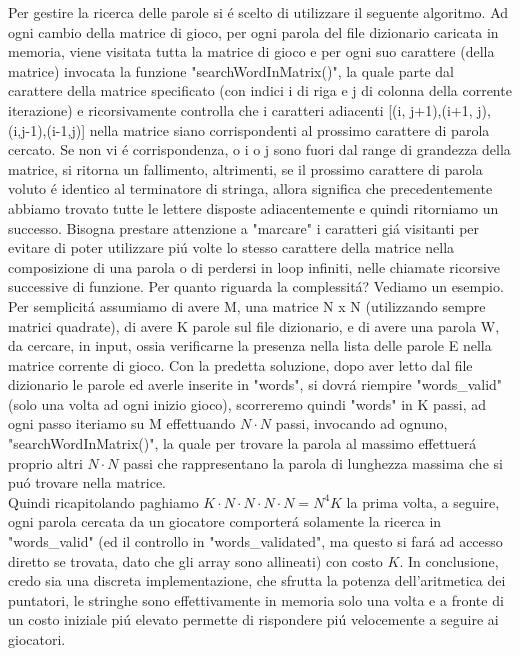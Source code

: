 Per gestire la ricerca delle parole si \'e scelto di utilizzare il seguente algoritmo. Ad ogni cambio della matrice di gioco, per ogni parola del file dizionario caricata in memoria, viene visitata tutta la matrice di gioco e per ogni suo carattere (della matrice) invocata la funzione "searchWordInMatrix()", la quale parte dal carattere della matrice specificato (con indici i di riga e j di colonna della corrente iterazione) e ricorsivamente controlla che i caratteri adiacenti [(i, j+1),(i+1, j),(i,j-1),(i-1,j)] nella matrice siano corrispondenti al prossimo carattere di parola cercato. Se non vi \'e corrispondenza, o i o j sono fuori dal range di grandezza della matrice, si ritorna un fallimento, altrimenti, se il prossimo carattere di parola voluto \'e identico al terminatore di stringa, allora significa che precedentemente abbiamo trovato tutte le lettere disposte adiacentemente e quindi ritorniamo un successo. Bisogna prestare attenzione a "marcare" i caratteri gi\'a visitanti per evitare di poter utilizzare pi\'u volte lo stesso carattere della matrice nella composizione di una parola o di perdersi in loop infiniti, nelle chiamate ricorsive successive di funzione. Per quanto riguarda la complessit\'a? Vediamo un esempio. Per semplicit\'a assumiamo di avere M, una matrice N x N (utilizzando sempre matrici quadrate), di avere K parole sul file dizionario, e di avere una parola W, da cercare, in input, ossia verificarne la presenza nella lista delle parole E nella matrice corrente di gioco. Con la predetta soluzione, dopo aver letto dal file dizionario le parole ed averle inserite in "words", si dovr\'a riempire "words\_valid" (solo una volta ad ogni inizio gioco), scorreremo quindi "words" in K passi, ad ogni passo iteriamo su M effettuando $N \cdot N$ passi, invocando ad ognuno, "searchWordInMatrix()", la quale per trovare la parola al massimo effettuer\'a proprio altri $N \cdot N$ passi che rappresentano la parola di lunghezza massima che si pu\'o trovare nella matrice.
\\
Quindi ricapitolando paghiamo $ K \cdot N \cdot N \cdot N \cdot N = N^4K $ la prima volta, a seguire, ogni parola cercata da un giocatore comporter\'a solamente la ricerca in "words\_valid" (ed il controllo in "words\_validated", ma questo si far\'a ad accesso diretto se trovata, dato che gli array sono allineati) con costo $ K $. In conclusione, credo sia una discreta implementazione, che sfrutta la potenza dell'aritmetica dei puntatori, le stringhe sono effettivamente in memoria solo una volta e a fronte di un costo iniziale pi\'u elevato permette di rispondere pi\'u velocemente a seguire ai giocatori.
\\

